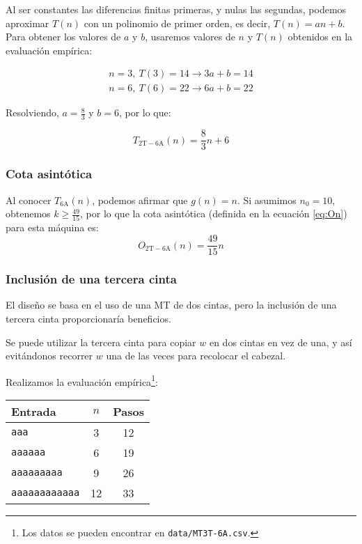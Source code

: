 Al ser constantes las diferencias finitas primeras, y nulas las segundas, podemos aproximar $T(n)$ con un polinomio de primer orden, es decir, $T(n) = an + b$.\\

Para obtener los valores de $a$ y $b$, usaremos valores de $n$ y $T(n)$ obtenidos en la evaluación empírica:

\begin{subequations}
    \begin{gather}
        n = 3,\ T(3) = 14 \rightarrow 3a + b = 14 \\
        n = 6,\ T(6) = 22 \rightarrow 6a + b = 22
    \end{gather}
\end{subequations}

Resolviendo, $a=\frac{8}{3}$ y $b=6$, por lo que:

\begin{equation}
    T_{\mathrm{2T-6A}}(n) = \frac{8}{3}n + 6
\end{equation}


\subsubsection*{Cota asintótica}
Al conocer $T_{\mathrm{6A}}(n)$, podemos afirmar que $g(n) = n$. Si asumimos $n_0 = 10$, obtenemos $k \geq \frac{49}{15}$, por lo que la cota asintótica (definida en la ecuación \ref{eq:On}) para esta máquina es:
\begin{equation}
    O_{\mathrm{2T-6A}}(n) = \frac{49}{15} n
\end{equation}



\subsubsection*{Inclusión de una tercera cinta} \label{sec:MT3T-6A}
El diseño se basa en el uso de una MT de dos cintas, pero la inclusión de una tercera cinta proporcionaría beneficios.

Se puede utilizar la tercera cinta para copiar $w$ en dos cintas en vez de una, y así evitándonos recorrer $w$ una de las veces para recolocar el cabezal.


Realizamos la evaluación empírica\footnote{Los datos se pueden encontrar en \texttt{data/MT3T-6A.csv}.}:

\begin{table}[h]
    \centering
    \begin{tabular}{lcc}
        Entrada & $n$ & Pasos \\
        \hline
        \texttt{aaa}                &  3  & 12 \\
        \texttt{aaaaaa}             &  6  & 19 \\
        \texttt{aaaaaaaaa}          &  9  & 26 \\
        \texttt{aaaaaaaaaaaa}       & 12  & 33 \\
    \end{tabular}
\end{table}

